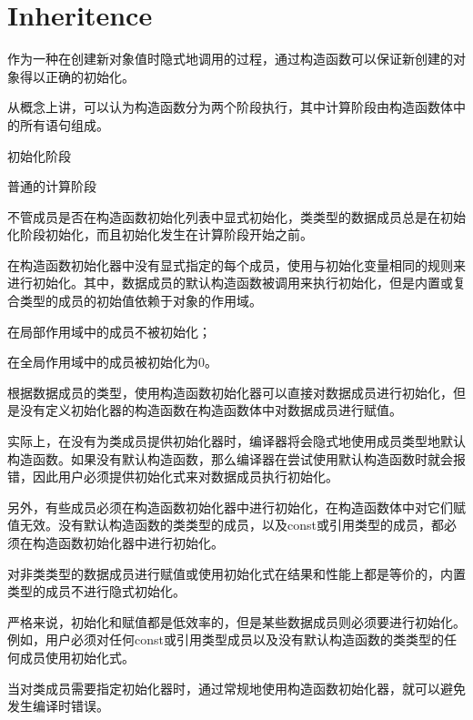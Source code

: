 \section{Inheritence}




作为一种在创建新对象值时隐式地调用的过程，通过构造函数可以保证新创建的对象得以正确的初始化。

从概念上讲，可以认为构造函数分为两个阶段执行，其中计算阶段由构造函数体中的所有语句组成。

\begin{compactenum}
\item 初始化阶段
\item 普通的计算阶段
\end{compactenum}

不管成员是否在构造函数初始化列表中显式初始化，类类型的数据成员总是在初始化阶段初始化，而且初始化发生在计算阶段开始之前。

在构造函数初始化器中没有显式指定的每个成员，使用与初始化变量相同的规则来进行初始化。其中，数据成员的默认构造函数被调用来执行初始化，但是内置或复合类型的成员的初始值依赖于对象的作用域。

\begin{compactitem}
\item 在局部作用域中的成员不被初始化；
\item 在全局作用域中的成员被初始化为0。
\end{compactitem}

根据数据成员的类型，使用构造函数初始化器可以直接对数据成员进行初始化，但是没有定义初始化器的构造函数在构造函数体中对数据成员进行赋值。

实际上，在没有为类成员提供初始化器时，编译器将会隐式地使用成员类型地默认构造函数。如果没有默认构造函数，那么编译器在尝试使用默认构造函数时就会报错，因此用户必须提供初始化式来对数据成员执行初始化。

另外，有些成员必须在构造函数初始化器中进行初始化，在构造函数体中对它们赋值无效。没有默认构造函数的类类型的成员，以及const或引用类型的成员，都必须在构造函数初始化器中进行初始化。

对非类类型的数据成员进行赋值或使用初始化式在结果和性能上都是等价的，内置类型的成员不进行隐式初始化。

严格来说，初始化和赋值都是低效率的，但是某些数据成员则必须要进行初始化。例如，用户必须对任何const或引用类型成员以及没有默认构造函数的类类型的任何成员使用初始化式。

当对类成员需要指定初始化器时，通过常规地使用构造函数初始化器，就可以避免发生编译时错误。


